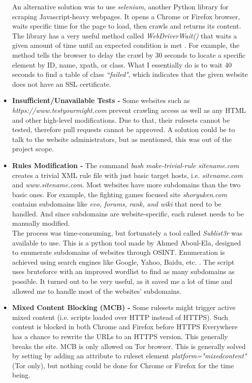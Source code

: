 \documentclass[a4paper, 12pt, titlepage]{article}
\begin{document}
\begin{itemize}
{An alternative solution was to use \textit{selenium}, another Python library for scraping Javascript-heavy webpages. It opens a Chrome or Firefox browser, waits specific time for the page to load, then crawls and returns its content. The library has a very useful method called \textit{WebDriverWait()} that waits a given amount of time until an expected condition is met \cite{SeleniumWDW}. For example, the method tells the browser to delay the crawl by 30 seconds to locate a specific element by ID, name, xpath, or class. What I essentially do is to wait 40 seconds to find a table of class \textit{``failed"}, which indicates that the given website does not have an SSL certificate.}
\item{\textbf{Insufficient/Unavailable Tests -} Some websites such as \textit{https://www.testyourmight.com} prevent crawling access as well as any HTML and other high-level modifications. Due to that, their rulesets cannot be tested, therefore pull requests cannot be approved. A solution could be to talk to the website administrators, but as mentioned, this was out of the project scope.}
\item{\textbf{Rules Modification - }The command \textit{bash make-trivial-rule sitename.com} creates a trivial XML rule file with just basic target hosts, i.e. \textit{sitename.com} and \textit{www.sitename.com}. Most websites have more subdomains than the two basic ones. For example, the fighting games focused site \textit{shoryuken.com} contains subdomains like \textit{evo, forums, rank, and wiki} that need to be handled. And since subdomains are website-specific, each ruleset needs to be manually modified. \\[6pt]
The process was time-consuming, but fortunately a tool called \textit{Sublist3r} was available to use. This is a python tool made by Ahmed Aboul-Ela, designed to enumerate subdomains of websites through OSINT. Enumeration is achieved using search engines like Google, Yahoo, Baidu, etc. \cite{Sublist3r}. The script uses bruteforce with an improved wordlist to find as many subdomains as possible. It turned out to be very useful, as it saved me a lot of time and allowed me to handle most of the websites' subdomains.}
\item{\textbf{Mixed Content Blocking (MCB) - }Some rulesets might trigger active mixed content (i.e. scripts loaded over HTTP instead of HTTPS). Such content is blocked in both Chrome and Firefox before HTTPS Everywhere has a chance to rewrite the URLs to an HTTPS version. This generally breaks the site. MCB is only allowed on Tor browser. This is generally solved by setting by adding an attribute to ruleset element \textit{platform="mixedcontent"} (Tor only), but nothing could be done for Chrome or Firefox for the time being.}

\end{itemize}
\end{document}
